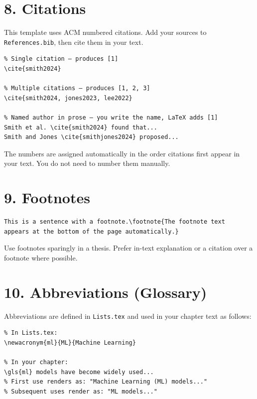 \section*{8. Citations}

\noindent
This template uses ACM numbered citations. Add your sources to
\texttt{References.bib}, then cite them in your text.

\begin{verbatim}
% Single citation — produces [1]
\cite{smith2024}

% Multiple citations — produces [1, 2, 3]
\cite{smith2024, jones2023, lee2022}

% Named author in prose — you write the name, LaTeX adds [1]
Smith et al. \cite{smith2024} found that...
Smith and Jones \cite{smithjones2024} proposed...
\end{verbatim}

\noindent
The numbers are assigned automatically in the order citations
first appear in your text. You do not need to number them manually.


\section*{9. Footnotes}

\begin{verbatim}
This is a sentence with a footnote.\footnote{The footnote text
appears at the bottom of the page automatically.}
\end{verbatim}

\noindent
Use footnotes sparingly in a thesis. Prefer in-text explanation
or a citation over a footnote where possible.


\section*{10. Abbreviations (Glossary)}

\noindent
Abbreviations are defined in \texttt{Lists.tex} and used in
your chapter text as follows:

\begin{verbatim}
% In Lists.tex:
\newacronym{ml}{ML}{Machine Learning}

% In your chapter:
\gls{ml} models have become widely used...
% First use renders as: "Machine Learning (ML) models..."
% Subsequent uses render as: "ML models..."
\end{verbatim}

